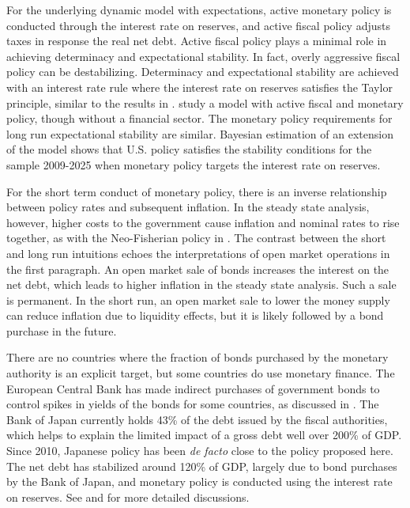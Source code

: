 \documentclass[]{article}
\begin{document}
For the underlying dynamic model with expectations, active monetary policy is conducted through the interest rate on reserves, and active fiscal policy adjusts taxes in response the real net debt. Active fiscal policy plays a minimal role in achieving determinacy and expectational stability. In fact, overly aggressive fiscal policy can be destabilizing. Determinacy and expectational stability are achieved with an interest rate rule where the interest rate on reserves satisfies the Taylor principle, similar to the results in \textcite{bullardmitra02}. \textcite{eusepi2018fiscal} study a model with active fiscal and monetary policy, though without a financial sector. The monetary policy requirements for long run expectational stability are similar. Bayesian estimation of an extension of the model shows that U.S. policy satisfies the stability conditions for the sample 2009-2025 when monetary policy targets the interest rate on reserves.

For the short term conduct of monetary policy, there is an inverse relationship between policy rates and subsequent inflation. In the steady state analysis, however, higher costs to the government cause inflation and nominal rates to rise together, as with the Neo-Fisherian policy in \textcite{cochrane2023NeoFisher}. The contrast between the short and long run intuitions echoes the interpretations of open market operations in the first paragraph. An open market sale of bonds increases the interest on the net debt, which leads to higher inflation in the steady state analysis. Such a sale is permanent. In the short run, an open market sale to lower the money supply can reduce inflation due to liquidity effects, but it is likely followed by a bond purchase in the future.

There are no countries where the fraction of bonds purchased by the monetary authority is an explicit target, but some countries do use monetary finance. The European Central Bank has made indirect purchases of government bonds to control spikes in yields of the bonds for some countries, as discussed in \textcite{Attavila2015OMT}. The Bank of Japan currently holds 43\% of the debt issued by the fiscal authorities, which helps to explain the limited impact of a gross debt well over 200\% of GDP. Since 2010, Japanese policy has been \textit{de facto} close to the policy proposed here. The net debt has stabilized around 120\% of GDP, largely due to bond purchases by the Bank of Japan, and monetary policy is conducted using the interest rate on reserves. See \textcite{Hansen2023JapanDebt} and \textcite{waters2024potentiallypleasant} for more detailed discussions.
\end{document}
